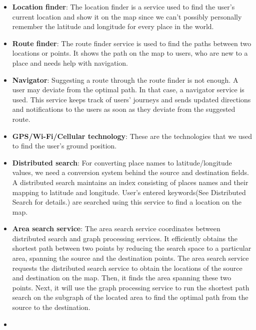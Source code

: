 \begin{itemize}
\item
\protect{}\label{ofhmpdBippl9wLwCrPY-I}
\textbf{Location finder}: The location finder is a service used to find the user's current location and show it on the map since we can't possibly personally remember the latitude and longitude for every place in the world.
\item
\protect{}\label{30sebUzngB0y5jOQDkPff}
\textbf{Route finder}: The route finder service is used to find the paths between two locations or points. It shows the path on the map to users, who are new to a place and needs help with navigation.
\item
\protect{}\label{aMPTuQ9d5wI3HKV3Wq8FI}
\textbf{Navigator}: Suggesting a route through the route finder is not enough. A user may deviate from the optimal path. In that case, a navigator service is used. This service keeps track of users' journeys and sends updated directions and notifications to the users as soon as they deviate from the suggested route.
\item
\protect{}\label{LabMI4BcN5qm66MPsmrUC}
\textbf{GPS/Wi-Fi/Cellular technology}: These are the technologies that we used to find the user's ground position.
\item
\protect{}\label{jWumJDSBhDDe5QHoFJi6H}
\textbf{Distributed search}: For converting place names to latitude/longitude values, we need a conversion system behind the source and destination fields. A distributed search maintains an index consisting of places names and their mapping to latitude and longitude. User's entered keywords(See Distributed Search for details.) are searched using this service to find a location on the map.
\item
\protect{}\label{pbUkP36B79gDa6Sl1O3S3}
\textbf{Area search service}: The area search service coordinates between distributed search and graph processing services. It efficiently obtains the shortest path between two points by reducing the search space to a particular area, spanning the source and the destination points. The area search service requests the distributed search service to obtain the locations of the source and destination on the map. Then, it finds the area spanning these two points. Next, it will use the graph processing service to run the shortest path search on the subgraph of the located area to find the optimal path from the source to the destination.
\item
\protect{}\label{DI6utyL9b35fVStW7UNh0}

\end{itemize}
